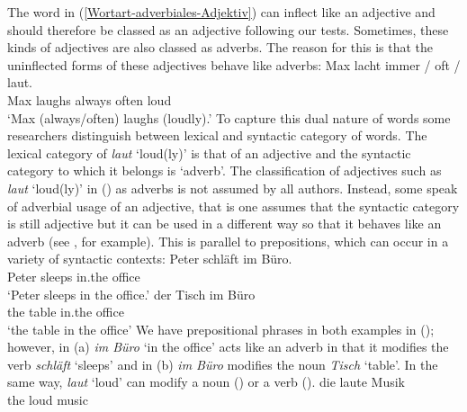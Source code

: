 {The word in (\ref{Wortart-adverbiales-Adjektiv}) can inflect like an adjective and should therefore be classed as an adjective following our tests. Sometimes, these
kinds of adjectives are also classed as adverbs. The reason for this is that the uninflected forms of these adjectives behave like adverbs:
\ea
\gll Max lacht immer / oft / laut.\\
	 Max laughs always {} often {} loud\\
\glt `Max (always/often) laughs (loudly).'
\z
%
To capture this dual nature of words some researchers distinguish between lexical and syntactic
category of words. The lexical category of \emph{laut} `loud(ly)' is that of an adjective and the syntactic category to which it belongs is
`adverb'. The classification of adjectives such as \emph{laut} `loud(ly)' in () as adverbs is not assumed by all authors.
Instead, some speak of adverbial usage of an adjective, that is one assumes that the syntactic category is still adjective but
it can be used in a different way so that it behaves like an adverb (see \citealp[Section~7.3]{Eisenberg2004a}, for example). This
is parallel to prepositions, which can occur in a variety of syntactic contexts:
\eal
\ex 
\gll Peter schläft im Büro.\\
     Peter sleeps in.the office\\
\glt `Peter sleeps in the office.'
\ex 
\gll der Tisch im Büro\\
     the table in.the office\\
\glt `the table in the office'
\zl
We have prepositional phrases in both examples in (); however, in (a) \emph{im Büro} `in the office' acts like an adverb in that it modifies the verb 
\emph{schläft} `sleeps' and in (b) \emph{im Büro} modifies the noun \emph{Tisch} `table'. In the same way, \emph{laut} `loud' can modify a noun () or
a verb ().
\ea
\gll die laute Musik\\
     the loud music\\
\z 

}
